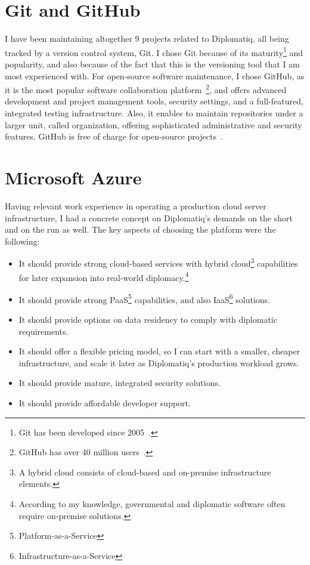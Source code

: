 \section{Git and GitHub}

I have been maintaining altogether 9 projects related to Diplomatiq, all being tracked by a version control system, Git. I chose Git because of its maturity\footnote{Git has been developed since 2005~\cite{git-initial-commit}.} and popularity, and also because of the fact that this is the versioning tool that I am most experienced with. For open-source software maintenance, I chose GitHub, as it is the most popular software collaboration platform~\footnote{GitHub has over 40 million users~\cite{github-user-count}.}, and offers advanced development and project management tools, security settings, and a full-featured, integrated testing infrastructure. Also, it enables to maintain repositories under a larger unit, called organization, offering sophisticated administrative and security features. GitHub is free of charge for open-source projects~\cite{github-pricing}.

\section{Microsoft Azure}

Having relevant work experience in operating a production cloud server infrastructure, I had a concrete concept on Diplomatiq's demands on the short and on the run as well. The key aspects of choosing the platform were the following:

\begin{itemize}
\item It should provide strong cloud-based services with hybrid cloud\footnote{A hybrid cloud consists of cloud-based and on-premise infrastructure elements.} capabilities for later expansion into real-world diplomacy.\footnote{According to my knowledge, governmental and diplomatic software often require on-premise solutions.}
\item It should provide strong PaaS\footnote{Platform-as-a-Service} capabilities, and also IaaS\footnote{Infrastructure-as-a-Service} solutions.
\item It should provide options on data residency to comply with diplomatic requirements.
\item It should offer a flexible pricing model, so I can start with a smaller, cheaper infrastructure, and scale it later as Diplomatiq's production workload grows.
\item It should provide mature, integrated security solutions.
\item It should provide affordable developer support.
\end{itemize}

